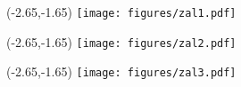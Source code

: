 \documentclass[12pt, oneside, a4paper]{mwbk}
\begin{document}








\lstlistoflistings

\listoffigures

\listoftables

\listofalgorithms

\newpage
\thispagestyle{empty}
\begin{textblock}{1}(-2.65,-1.65)
\texttt{[image: figures/zal1.pdf]}
\end{textblock}
\newpage
\thispagestyle{empty}
\begin{textblock}{1}(-2.65,-1.65)
	\texttt{[image: figures/zal2.pdf]}
\end{textblock}
\newpage
\thispagestyle{empty}
\begin{textblock}{1}(-2.65,-1.65)
	\texttt{[image: figures/zal3.pdf]}
\end{textblock}
\end{document}
